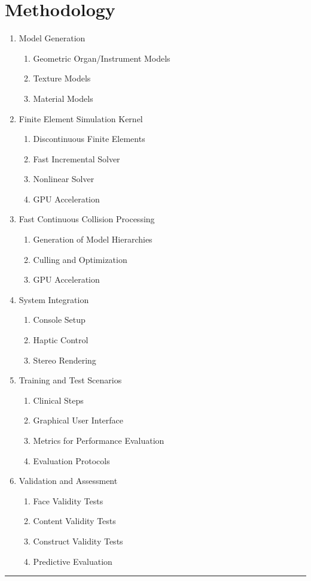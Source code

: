 
\chapter{Methodology}\label{chp:methodology}

\begin{enumerate}
  \item Model Generation
  \begin{enumerate}
    \item Geometric Organ/Instrument Models
    \item Texture Models
    \item Material Models
  \end{enumerate}

  \item Finite Element Simulation Kernel
  \begin{enumerate}
    \item Discontinuous Finite Elements
    \item Fast Incremental Solver
    \item Nonlinear Solver
    \item GPU Acceleration
  \end{enumerate}

  \item Fast Continuous Collision Processing
  \begin{enumerate}
    \item Generation of Model Hierarchies
    \item Culling and Optimization
    \item GPU Acceleration
  \end{enumerate}

  \item System Integration
  \begin{enumerate}
    \item Console Setup
    \item Haptic Control
    \item Stereo Rendering
  \end{enumerate}

  \item Training and Test Scenarios
  \begin{enumerate}
    \item Clinical Steps
    \item Graphical User Interface
    \item Metrics for Performance Evaluation
    \item Evaluation Protocols
  \end{enumerate}

  \item Validation and Assessment
  \begin{enumerate}
    \item Face Validity Tests
    \item Content Validity Tests
    \item Construct Validity Tests
    \item Predictive Evaluation
  \end{enumerate}
\end{enumerate}

\hrule%
\clearpage%







